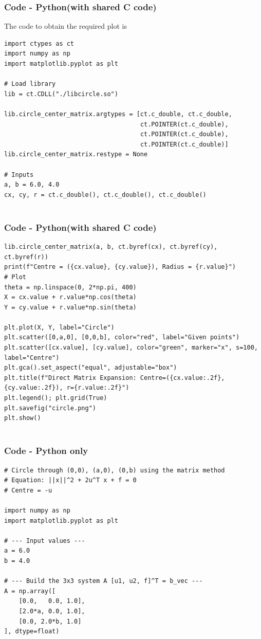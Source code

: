 \documentclass{beamer}
\theoremstyle{remark}
\numberwithin{equation}{section}
\begin{document}
\begin{frame}[fragile]
    \frametitle{Code - Python(with shared C code)}
    The code to obtain the required plot is
    \begin{lstlisting}
import ctypes as ct
import numpy as np
import matplotlib.pyplot as plt

# Load library
lib = ct.CDLL("./libcircle.so")

lib.circle_center_matrix.argtypes = [ct.c_double, ct.c_double,
                                     ct.POINTER(ct.c_double),
                                     ct.POINTER(ct.c_double),
                                     ct.POINTER(ct.c_double)]
lib.circle_center_matrix.restype = None

# Inputs
a, b = 6.0, 4.0
cx, cy, r = ct.c_double(), ct.c_double(), ct.c_double()


\end{lstlisting}
\end{frame}
\begin{frame}[fragile]
\frametitle{Code - Python(with shared C code)}
\begin{lstlisting}
lib.circle_center_matrix(a, b, ct.byref(cx), ct.byref(cy), ct.byref(r))
print(f"Centre = ({cx.value}, {cy.value}), Radius = {r.value}")
# Plot
theta = np.linspace(0, 2*np.pi, 400)
X = cx.value + r.value*np.cos(theta)
Y = cy.value + r.value*np.sin(theta)

plt.plot(X, Y, label="Circle")
plt.scatter([0,a,0], [0,0,b], color="red", label="Given points")
plt.scatter([cx.value], [cy.value], color="green", marker="x", s=100, label="Centre")
plt.gca().set_aspect("equal", adjustable="box")
plt.title(f"Direct Matrix Expansion: Centre=({cx.value:.2f},{cy.value:.2f}), r={r.value:.2f}")
plt.legend(); plt.grid(True)
plt.savefig("circle.png")
plt.show()


\end{lstlisting}
\end{frame}



\begin{frame}[fragile]
\frametitle{Code - Python only}
\begin{lstlisting}
# Circle through (0,0), (a,0), (0,b) using the matrix method
# Equation: ||x||^2 + 2u^T x + f = 0
# Centre = -u

import numpy as np
import matplotlib.pyplot as plt

# --- Input values ---
a = 6.0
b = 4.0

# --- Build the 3x3 system A [u1, u2, f]^T = b_vec ---
A = np.array([
    [0.0,   0.0, 1.0],
    [2.0*a, 0.0, 1.0],
    [0.0, 2.0*b, 1.0]
], dtype=float)



\end{lstlisting}
\end{frame}
\end{document}
